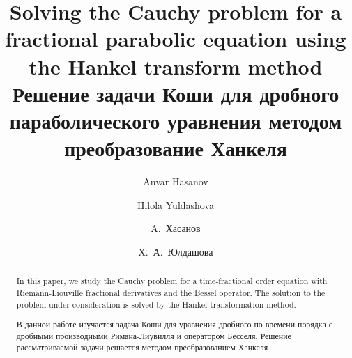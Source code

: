 \begin{englishtitle}
\title{Solving the Cauchy problem for a fractional parabolic equation using the Hankel transform method
}
\author{Anvar Hasanov \and Hilola Yuldashova}

\maketitle

\begin{abstract}
In this paper, we study the Cauchy problem for a time-fractional order equation with Riemann-Liouville fractional derivatives and the Bessel operator. The solution to the problem under consideration is solved by the Hankel transformation method. 

\end{abstract}
\end{englishtitle}

\iffalse
\documentclass[12pt]{llncs}
\usepackage[T2A]{fontenc}
\usepackage[utf8]{inputenc}
\usepackage[english,russian]{babel}
\usepackage[russian]{nla}




\fi

\title{Решение задачи Коши для дробного параболического уравнения методом преобразование Ханкеля}
\author{A.~Хасанов \and Х.~А.~Юлдашова
} %

\maketitle

\begin{abstract}
В данной работе изучается задача Коши для уравнения дробного по времени порядка с дробными производными Римана-Лиувилля и оператором Бесселя. Решение рассматриваемой задачи решается методом преобразованием Ханкеля. 

\end{abstract}

